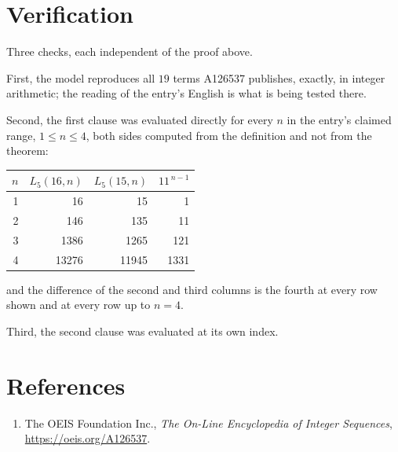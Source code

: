 \documentclass[11pt,a4paper]{article}
\theoremstyle{plain}
\theoremstyle{definition}
\begin{document}
\section{Verification}

Three checks, each independent of the proof above.

First, the model reproduces all $19$ terms A126537 publishes, exactly, in integer
arithmetic; the reading of the entry's English is what is being tested there.

Second, the first clause was evaluated directly for every $n$ in the entry's claimed range,
$1\le n\le4$, both sides computed from the definition and not from the theorem:

\begin{center}
\begin{tabular}{rrrr}
$n$ & $L_{5}(16,n)$ & $L_{5}(15,n)$ & $11^{\,n-1}$ \\ \hline
1 & 16 & 15 & 1 \\
2 & 146 & 135 & 11 \\
3 & 1386 & 1265 & 121 \\
4 & 13276 & 11945 & 1331 \\
\end{tabular}
\end{center}

\noindent and the difference of the second and third columns is the fourth at every row shown
and at every row up to $n=4$.

Third, the second clause was evaluated at its own index.

\section*{References}
\begin{enumerate}
\item The OEIS Foundation Inc., \emph{The On-Line Encyclopedia of Integer Sequences},
\url{https://oeis.org/A126537}.
\end{enumerate}
\end{document}
